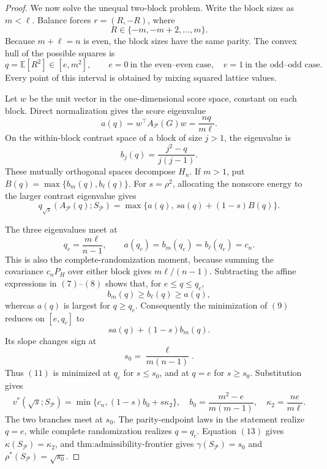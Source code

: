 \documentclass{article}
\begin{document}
\begin{proof}
We now solve the unequal two-block problem.  Write the block sizes as \(m<\ell\).  Balance forces \(r=(R,-R)\), where
\[
R\in\{-m,-m+2,\ldots,m\}.
\]
Because \(m+\ell=n\) is even, the block sizes have the same parity.  The convex hull of the possible squares is
\[
q=\mathbb E[R^2]\in[e,m^2],
\qquad
e=0\ \text{in the even--even case},\quad e=1\ \text{in the odd--odd case}.
\tag{6}
\]
Every point of this interval is obtained by mixing squared lattice values.

Let \(w\) be the unit vector in the one-dimensional score space, constant on each block.  Direct normalization gives the score eigenvalue
\[
a(q)=w^\top A_{\mathcal P}(G)w=\frac{nq}{m\ell}.
\tag{7}
\]
On the within-block contrast space of a block of size \(j>1\), the eigenvalue is
\[
b_j(q)=\frac{j^2-q}{j(j-1)}.
\tag{8}
\]
These mutually orthogonal spaces decompose \(H_n\).  If \(m>1\), put \(B(q)=\max\{b_m(q),b_\ell(q)\}\).  For \(s=\rho^2\), allocating the nonscore energy to the larger contrast eigenvalue gives
\[
q_{\sqrt{s}}(A_{\mathcal P}(q);S_{\mathcal P})
=\max\{a(q),\,sa(q)+(1-s)B(q)\}.
\tag{9}
\]

The three eigenvalues meet at
\[
q_c=\frac{m\ell}{n-1},
\qquad
a(q_c)=b_m(q_c)=b_\ell(q_c)=c_n.
\tag{10}
\]
This is also the complete-randomization moment, because summing the covariance \(c_nP_H\) over either block gives \(m\ell/(n-1)\).  Subtracting the affine expressions in \((7)\)--\((8)\) shows that, for \(e\leq q\leq q_c\),
\[
b_m(q)\geq b_\ell(q)\geq a(q),
\]
whereas \(a(q)\) is largest for \(q\geq q_c\).  Consequently the minimization of \((9)\) reduces on \([e,q_c]\) to
\[
sa(q)+(1-s)b_m(q).
\tag{11}
\]
Its slope changes sign at
\[
s_0=\frac{\ell}{m(n-1)}.
\tag{12}
\]
Thus \((11)\) is minimized at \(q_c\) for \(s\leq s_0\), and at \(q=e\) for \(s\geq s_0\).  Substitution gives
\[
v^*(\sqrt{s};S_{\mathcal P})
=\min\{c_n,(1-s)b_0+s\kappa_2\},
\quad
b_0=\frac{m^2-e}{m(m-1)},
\quad
\kappa_2=\frac{ne}{m\ell}.
\tag{13}
\]
The two branches meet at \(s_0\).  The parity-endpoint laws in the statement realize \(q=e\), while complete randomization realizes \(q=q_c\).  Equation \((13)\) gives \(\kappa(S_{\mathcal P})=\kappa_2\), and \(\text{thm:admissibility-frontier}\) gives \(\gamma(S_{\mathcal P})=s_0\) and \(\rho^*(S_{\mathcal P})=\sqrt{s_0}\).


\end{proof}
\end{document}
